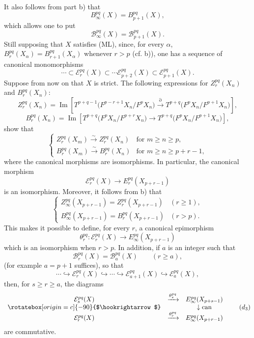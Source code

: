 \documentclass[11pt]{article}
\providecommand{\Im}{\operatorname{Im}}
\renewcommand{\Im}{\operatorname{Im}}
\providecommand{\Im}{\operatorname{Im}}
\providecommand{\can}{\operatorname{can}}
\begin{document}
It also follows from part b) that
\[
B_\infty^{pq}(X)=B_{p+1}^{pq}(X),
\]
which allows one to put
\[
\mathcal B_\infty^{pq}(X)=\mathcal B_{p+1}^{pq}(X).
\]
Still supposing that \(X\) satisfies (ML), since, for every \(\alpha\),
\(B_r^{pq}(X_\alpha)=B_{r+1}^{pq}(X_\alpha)\) whenever \(r>p\) (cf. b)),
one has a sequence of canonical monomorphisms
\begin{equation}
\cdots\subset\mathcal E_r^{pq}(X)\subset\cdots\mathcal E_{p+2}^{pq}(X)\subset\mathcal E_{p+1}^{pq}(X).
\tag{S}
\end{equation}
Suppose from now on that \(X\) is strict. The following expressions for \(Z_r^{pq}(X_n)\) and \(B_r^{pq}(X_n)\):
\[
Z_r^{pq}(X_n)=
\Im\!\left[
T^{p+q-1}\bigl(F^{p-r+1}X_n/F^pX_n\bigr)
\xrightarrow{\partial}
T^{p+q}\bigl(F^pX_n/F^{p+1}X_n\bigr)
\right],
\]
\[
B_r^{pq}(X_n)=
\Im\!\left[
T^{p+q}\bigl(F^pX_n/F^{p+r}X_n\bigr)
\longrightarrow
T^{p+q}\bigl(F^pX_n/F^{p+1}X_n\bigr)
\right],
\]
show that
\begin{equation}
\left\{
\begin{array}{ll}
Z_r^{pq}(X_m)\xrightarrow{\sim}Z_r^{pq}(X_n)&\text{for }m\ge n\ge p,\\[3pt]
B_r^{pq}(X_m)\xrightarrow{\sim}B_r^{pq}(X_n)&\text{for }m\ge n\ge p+r-1,
\end{array}
\right.
\tag{\(d_1\)}
\end{equation}
where the canonical morphisms are isomorphisms. In particular, the canonical morphism
\[
\mathcal E_r^{pq}(X)\longrightarrow E_r^{pq}(X_{p+r-1})
\]
is an isomorphism. Moreover, it follows from b) that
\begin{equation}
\left\{
\begin{array}{ll}
Z_\infty^{pq}(X_{p+r-1})=Z_r^{pq}(X_{p+r-1})&(r\ge1),\\[3pt]
B_\infty^{pq}(X_{p+r-1})=B_r^{pq}(X_{p+r-1})&(r>p).
\end{array}
\right.
\tag{\(d_2\)}
\end{equation}
This makes it possible to define, for every \(r\), a canonical epimorphism
\[
\theta_r^{pq}:\mathcal E_r^{pq}(X)\longrightarrow E_\infty^{pq}(X_{p+r-1})
\]
which is an isomorphism when \(r>p\). In addition, if \(a\) is an integer such that
\[
\mathcal B_r^{pq}(X)=\mathcal B_a^{pq}(X)\qquad(r\ge a),
\]
(for example \(a=p+1\) suffices), so that
\begin{equation}
\cdots\hookrightarrow\mathcal E_r^{pq}(X)\hookrightarrow\cdots\hookrightarrow
\mathcal E_{a+1}^{pq}(X)\hookrightarrow\mathcal E_a^{pq}(X),
\tag{S bis}
\end{equation}
then, for \(s\ge r\ge a\), the diagrams
\begin{equation}
\begin{array}{ccc}
\mathcal E_s^{pq}(X)&\xrightarrow{\theta_s^{pq}}&E_\infty^{pq}(X_{p+s-1})\\
\rotatebox[origin=c]{-90}{$\hookrightarrow$}&&\downarrow\can\\
\mathcal E_r^{pq}(X)&\xrightarrow{\theta_r^{pq}}&E_\infty^{pq}(X_{p+r-1})
\end{array}
\tag{\(d_3\)}
\end{equation}
are commutative.
\end{document}
